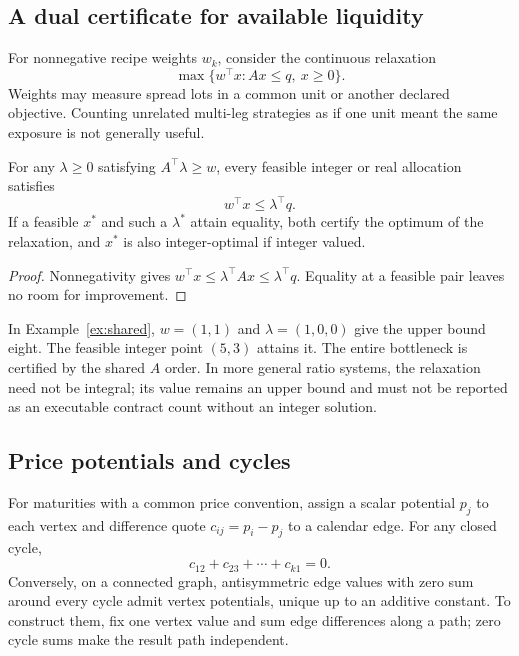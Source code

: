 \subsection{A dual certificate for available liquidity}

For nonnegative recipe weights $w_k$, consider the continuous relaxation
\begin{equation}
 \max\{w^\top x:Ax\le q,\ x\ge0\}.
\label{eq:primal}
\end{equation}
Weights may measure spread lots in a common unit or another declared objective. Counting unrelated multi-leg strategies as if one unit meant the same exposure is not generally useful.

\begin{proposition}\label{prop:dual}
For any $\lambda\ge0$ satisfying $A^\top\lambda\ge w$, every feasible integer or real allocation satisfies
\begin{equation}
 w^\top x\le\lambda^\top q.
\end{equation}
If a feasible $x^*$ and such a $\lambda^*$ attain equality, both certify the optimum of the relaxation, and $x^*$ is also integer-optimal if integer valued.
\end{proposition}
\begin{proof}
Nonnegativity gives $w^\top x\le\lambda^\top Ax\le\lambda^\top q$. Equality at a feasible pair leaves no room for improvement.
\end{proof}

In Example~\ref{ex:shared}, $w=(1,1)$ and $\lambda=(1,0,0)$ give the upper bound eight. The feasible integer point $(5,3)$ attains it. The entire bottleneck is certified by the shared $A$ order. In more general ratio systems, the relaxation need not be integral; its value remains an upper bound and must not be reported as an executable contract count without an integer solution.

\subsection{Price potentials and cycles}

For maturities with a common price convention, assign a scalar potential $p_j$ to each vertex and difference quote $c_{ij}=p_i-p_j$ to a calendar edge. For any closed cycle,
\begin{equation}
 c_{12}+c_{23}+\cdots+c_{k1}=0.
\label{eq:cycle}
\end{equation}
Conversely, on a connected graph, antisymmetric edge values with zero sum around every cycle admit vertex potentials, unique up to an additive constant. To construct them, fix one vertex value and sum edge differences along a path; zero cycle sums make the result path independent.

